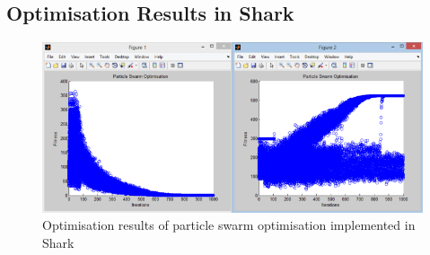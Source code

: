 \begin{landscape}
\subsection{Optimisation Results in Shark}
\label{sec:appendix21}
  \begin{figure}[h]
    \begin{center}
      \includegraphics{Figures/sharkpso}
    \end{center}
    \caption{Optimisation results of particle swarm optimisation implemented in Shark}
    \label{fig:phase1}
  \end{figure}
\end{landscape}